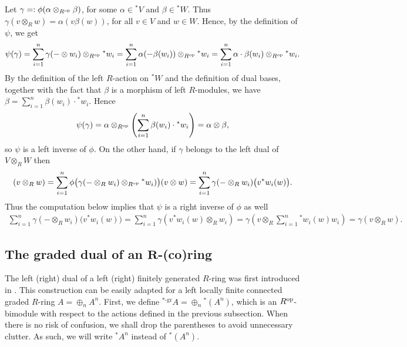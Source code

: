 \documentclass[pdftex]{sigma}
\newcommand\ot{\otimes}
\newcommand\op{\oplus}
\renewcommand{\^}[1]{\mbox{$^{\left( #1 \right)}$}}
\renewcommand{\_}[1]{\mbox{$_{\left( #1 \right)}$}}
\numberwithin{equation}{section}
\begin{document}
Let $ \gamma =:\phi(\alpha \ot_{R^{\rm op}} \beta)$, for some $\alpha\in{}^*V$ and $\beta\in{}^*W$. Thus $\gamma(v \ot_R w)=\alpha(v\beta(w))$, for all $v\in V$ and $w\in W$. Hence, by the def\/inition of $\psi$, we get
\begin{gather*}
 \psi(\gamma) = \sum_{i=1}^n \gamma(-\ot w_i)\ot_{R^{\rm op}}{^*}w_i = \sum_{i=1}^n \alpha(-\beta(w_i))\ot_{R^{\rm op}}{^*}w_i = \sum_{i=1}^n\alpha\cdot \beta(w_i)\ot_{R^{\rm op}}{^*}w_i.
\end{gather*}
By the def\/inition of the left $R$-action on $^*W$ and the def\/inition of dual bases, together with the fact that $\beta$ is a morphism of left $R$-modules, we have $\beta=\sum\limits_{i=1}^n\beta(w_i)\cdot {^*}w_i$. Hence
\begin{gather*}
 \psi(\gamma)=\alpha \ot_{R^{\rm op}}\left(\sum_{i=1}^n\beta(w_i)\cdot {^*}w_i\right) =\alpha\ot \beta,
\end{gather*}
so $\psi$ is a left inverse of $\phi$.
On the other hand, if $\gamma$ belongs to the left dual of $V\ot_RW$ then
\begin{gather*}
[\phi(\psi(\gamma))](v \ot_R w) = \sum_{i=1}^n\phi\big(\gamma(-\ot_R w_i)\ot_{R^{\rm op}} {^*}w_i)\big)(v \ot w) = \sum_{i=1}^n\gamma(-\ot_R w_i)\big(v{}^*w_i(w)\big).
\end{gather*}
Thus the computation below implies that $\psi$ is a right inverse of $\phi$ as well
\begin{gather*}
\sum_{i=1}^n\gamma(-\ot_R w_i)\big(v{}^*w_i(w)\big)=\sum_{i=1}^n\gamma(v{}^*w_i(w)\ot_Rw_i)=\gamma(v\ot_R \sum_{i=1}^n{}^*w_i(w)w_i)=\gamma(v\ot_R w) .
\end{gather*}

\subsection[The graded dual of an $R$-(co)ring]{The graded dual of an $\boldsymbol{R}$-(co)ring} \label{sec:gr-dual} The left (right) dual of a left (right) f\/initely generated $R$-ring was f\/irst introduced in \cite[Section~17.9]{brw}. This construction can be easily adapted for a left locally f\/inite connected graded $R$-ring $A=\op_n A^n$. First, we def\/ine ${^{*\text{-gr}}}\! A = \op_n {^*}(A^n)$, which is an $R^{\rm op}$-bimodule with respect to the actions def\/ined in the previous subsection. When there is no risk of confusion, we shall drop the parentheses to avoid unnecessary clutter. As such, we will write ${^*}\!A^n$ instead of ${^*}(A^n)$.
\end{document}
